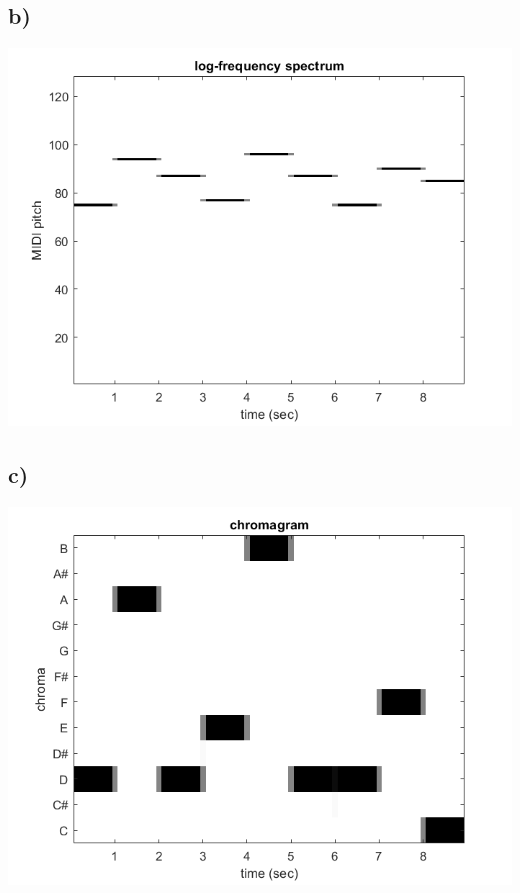 \documentclass[12pt]{article}
\begin{document}
\subsection*{b)}
    \begin{center}
        \includegraphics[width=\linewidth]{logspectrum}
    \end{center}

\subsection*{c)}
\begin{center}
    \includegraphics[width=\linewidth]{chromagram}
\end{center}
\end{document}
